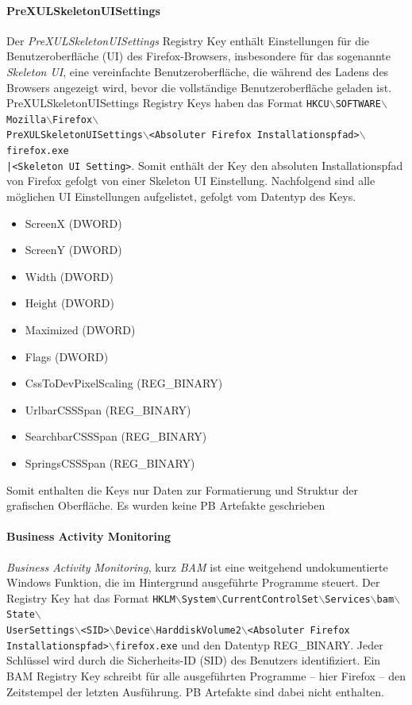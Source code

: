 \begin{appendices}
		\paragraph*{PreXULSkeletonUISettings}
		Der \textit{PreXULSkeletonUISettings} Registry Key enthält Einstellungen für die Benutzeroberfläche (UI) des Firefox-Browsers, insbesondere für das sogenannte \textit{Skeleton UI}, eine vereinfachte Benutzeroberfläche, die während des Ladens des Browsers angezeigt wird, bevor die vollständige Benutzeroberfläche geladen ist. 
		PreXULSkeletonUISettings Registry Keys haben das Format \texttt{HKCU$\backslash$SOFTWARE$\backslash$Mozilla$\backslash$Firefox$\backslash$\\PreXULSkeletonUISettings$\backslash$<Absoluter Firefox Installationspfad>$\backslash$firefox.exe\\|<Skeleton UI Setting>}.
		Somit enthält der Key den absoluten Installationspfad von Firefox gefolgt von einer Skeleton UI Einstellung. Nachfolgend sind alle möglichen UI Einstellungen aufgelistet, gefolgt vom Datentyp des Keys. \cite{Mills.2021}
		\begin{itemize}
			\item ScreenX (DWORD)
			\item ScreenY (DWORD)
			\item Width (DWORD)
			\item Height (DWORD)
			\item Maximized (DWORD)
			\item Flags (DWORD)
			\item CssToDevPixelScaling (REG\_BINARY)
			\item UrlbarCSSSpan (REG\_BINARY)
			\item SearchbarCSSSpan (REG\_BINARY)
			\item SpringsCSSSpan (REG\_BINARY)
		\end{itemize}
		Somit enthalten die Keys nur Daten zur Formatierung und Struktur der grafischen Oberfläche. Es wurden keine PB Artefakte geschrieben
		
		\paragraph*{Business Activity Monitoring}
		\textit{Business Activity Monitoring}, kurz \textit{BAM} ist eine weitgehend undokumentierte Windows Funktion, die im Hintergrund ausgeführte Programme steuert.
		Der Registry Key hat das Format \texttt{HKLM$\backslash$System$\backslash$CurrentControlSet$\backslash$Services$\backslash$bam$\backslash$State$\backslash$\\UserSettings$\backslash$<SID>$\backslash$Device$\backslash$HarddiskVolume2$\backslash$<Absoluter Firefox\\ Installationspfad>$\backslash$firefox.exe} und den Datentyp REG\_BINARY.
		Jeder Schlüssel wird durch die Sicherheits-ID (SID) des Benutzers identifiziert.
		Ein BAM Registry Key schreibt für alle ausgeführten Programme -- hier Firefox -- den Zeitstempel der letzten Ausführung.
		PB Artefakte sind dabei nicht enthalten. \cite{MandiOhlinger.05.06.2023, InfoSecNotes.05.06.2023}
		

\end{appendices}
